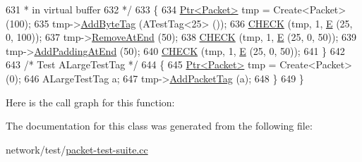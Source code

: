 \begin{DoxyCode}
631 \textcolor{comment}{   * in virtual buffer}
632 \textcolor{comment}{   */}
633   \{
634     \hyperlink{classns3_1_1Ptr}{Ptr<Packet>} tmp = Create<Packet> (100);
635     tmp->\hyperlink{classns3_1_1Packet_ad5997caea8c22757acade2fcb4d7daca}{AddByteTag} (ATestTag<25> ());
636     \hyperlink{packet-test-suite_8cc_a11af326b9297affa78c47b78c80f8a44}{CHECK} (tmp, 1, \hyperlink{packet-test-suite_8cc_a171669980e29849aa5e3722d573181ee}{E} (25, 0, 100));
637     tmp->\hyperlink{classns3_1_1Packet_a607de6c1abda2a960e99a3b59fd35d14}{RemoveAtEnd} (50);
638     \hyperlink{packet-test-suite_8cc_a11af326b9297affa78c47b78c80f8a44}{CHECK} (tmp, 1, \hyperlink{packet-test-suite_8cc_a171669980e29849aa5e3722d573181ee}{E} (25, 0, 50));
639     tmp->\hyperlink{classns3_1_1Packet_ae964f1fcfd496c6c0db1b73f27e78530}{AddPaddingAtEnd} (50);
640     \hyperlink{packet-test-suite_8cc_a11af326b9297affa78c47b78c80f8a44}{CHECK} (tmp, 1, \hyperlink{packet-test-suite_8cc_a171669980e29849aa5e3722d573181ee}{E} (25, 0, 50));
641   \}
642 
643   \textcolor{comment}{/* Test ALargeTestTag */}
644   \{
645     \hyperlink{classns3_1_1Ptr}{Ptr<Packet>} tmp = Create<Packet> (0);
646     ALargeTestTag a;
647     tmp->\hyperlink{classns3_1_1Packet_a7400b8655852f5271c5957250d0141af}{AddPacketTag} (a); 
648   \}
649 \}
\end{DoxyCode}


Here is the call graph for this function\+:




The documentation for this class was generated from the following file\+:\begin{DoxyCompactItemize}
\item 
network/test/\hyperlink{packet-test-suite_8cc}{packet-\/test-\/suite.\+cc}\end{DoxyCompactItemize}
